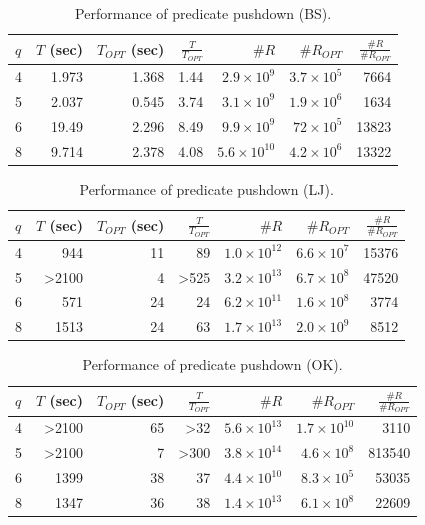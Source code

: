 \begin{table}
  \caption{Performance of predicate pushdown (BS).}\label{tab:pushdown_bs}
  \begin{tabular}{lrrrrrr}
    \toprule
    $q$ & \parbox{5mm}{$T$ (sec)} & \parbox{5mm}{$T_{OPT}$ (sec)} & $\frac{T}{T_{OPT}}$ & $\#R$ & $\#R_{OPT}$ & $\frac{\#R}{\#R_{OPT}}$ \\
     & 1.973 &     1.368 &     1.44 & $2.9 \times 10^9$ &        $3.7 \times 10 ^5$ &            7664 \\
    5 & 2.037 &     0.545 &     3.74 & $3.1 \times 10^9$ &   $1.9 \times 10^6$ &            1634 \\
    6 & 19.49 &     2.296 &     8.49 & $9.9 \times 10^9$ &        $72\times10^5$ &           13823 \\
    8 & 9.714 &     2.378 &     4.08 & $5.6 \times 10^{10}$ &   $4.2 \times 10^6$ &           13322 \\
    \bottomrule
  \end{tabular}
\end{table}

\begin{table}
  \caption{Performance of predicate pushdown (LJ).}\label{tab:pushdown_lj}
  \begin{tabular}{lrrrrrr}
    \toprule
    $q$ & \parbox{5mm}{$T$ (sec)} & \parbox{5mm}{$T_{OPT}$ (sec)} & $\frac{T}{T_{OPT}}$ & $\#R$ & $\#R_{OPT}$ & $\frac{\#R}{\#R_{OPT}}$ \\
     &   944 &        11 &       89 &   $1.0 \times 10^{12}$ &   $6.6 \times 10^7$ &     15376 \\
    5 & >2100 &         4 &     >525 &  $3.2 \times 10^{13}$  &   $6.7 \times 10^8$ &     47520 \\
    6 &   571 &        24 &       24 &   $6.2 \times 10^{11}$ &   $1.6 \times 10^8$ &      3774 \\
    8 &  1513 &        24 &       63 &   $1.7 \times 10^{13}$ &    $2.0 \times 10^9$ &      8512 \\
    \bottomrule
  \end{tabular}
\end{table}

\begin{table}
  \caption{Performance of predicate pushdown (OK).}\label{tab:pushdown_ok}
  \begin{tabular}{lrrrrrr}
    \toprule
    $q$ & \parbox{5mm}{$T$ (sec)} & \parbox{5mm}{$T_{OPT}$ (sec)} & $\frac{T}{T_{OPT}}$ & $\#R$ & $\#R_{OPT}$ & $\frac{\#R}{\#R_{OPT}}$ \\
     & >2100 &        65 &      >32 &  $5.6 \times 10^{13}$ &   $1.7 \times 10^{10}$ &      3110 \\
    5 & >2100 &         7 &     >300 &  $3.8 \times 10^{14}$ &     $4.6 \times 10^8$ &     813540 \\
    6 &  1399 &        38 &       37 &  $4.4 \times 10^{10}$ &     $8.3 \times 10^5$ &      53035 \\
    8 &  1347 &        36 &       38 &  $1.4 \times 10^{13}$ &     $6.1 \times 10^8$ &      22609 \\
    \bottomrule
  \end{tabular}
\end{table}
